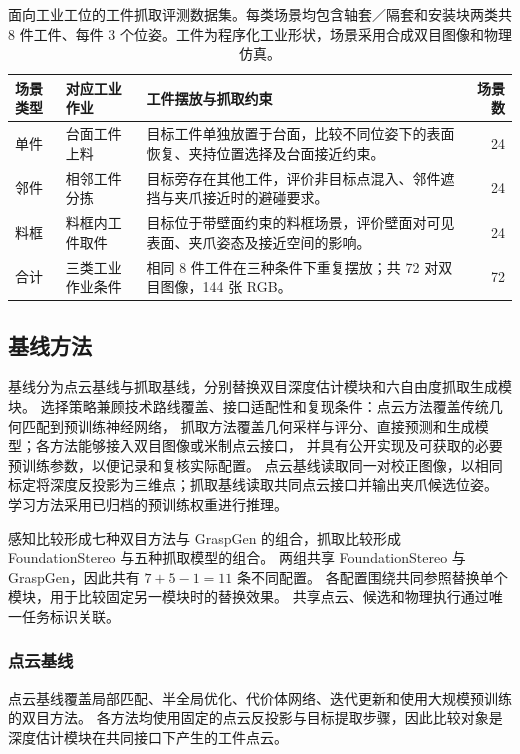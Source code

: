 \documentclass[UTF8,fontset=fandol,a4paper,11pt]{ctexart}
\newcommand{\qyb}[1]{\textcolor{red!75!black}{#1}}
\begin{document}
\begin{table}[H]
\centering\small
\caption{面向工业工位的工件抓取评测数据集。每类场景均包含轴套／隔套和安装块两类共 8 件工件、每件 3 个位姿。工件为程序化工业形状，场景采用合成双目图像和物理仿真。}
\label{tab:industrial-scenes}
\begin{tabularx}{\linewidth}{P{1.8cm}P{2.4cm}Y r}
\toprule
场景类型 & 对应工业作业 & 工件摆放与抓取约束 & 场景数 \\
\midrule
单件 & 台面工件上料 & 目标工件单独放置于台面，比较不同位姿下的表面恢复、夹持位置选择及台面接近约束。 & 24 \\
邻件 & 相邻工件分拣 & 目标旁存在其他工件，评价非目标点混入、邻件遮挡与夹爪接近时的避碰要求。 & 24 \\
料框 & 料框内工件取件 & 目标位于带壁面约束的料框场景，评价壁面对可见表面、夹爪姿态及接近空间的影响。 & 24 \\
\midrule
合计 & 三类工业作业条件 & 相同 8 件工件在三种条件下重复摆放；共 72 对双目图像，144 张 RGB。 & 72 \\
\bottomrule
\end{tabularx}
\end{table}

\subsection{\qyb{基线方法}}

基线分为点云基线与抓取基线，分别替换双目深度估计模块和六自由度抓取生成模块。
选择策略兼顾技术路线覆盖、接口适配性和复现条件：点云方法覆盖传统几何匹配到预训练神经网络，
抓取方法覆盖几何采样与评分、直接预测和生成模型；各方法能够接入双目图像或米制点云接口，
并具有公开实现及可获取的必要预训练参数，以便记录和复核实际配置。
点云基线读取同一对校正图像，以相同标定将深度反投影为三维点；抓取基线读取共同点云接口并输出夹爪候选位姿。
学习方法采用已归档的预训练权重进行推理。

感知比较形成七种双目方法与 GraspGen 的组合，抓取比较形成 FoundationStereo 与五种抓取模型的组合。
两组共享 FoundationStereo 与 GraspGen，因此共有 $7+5-1=11$ 条不同配置。
各配置围绕共同参照替换单个模块，用于比较固定另一模块时的替换效果。
共享点云、候选和物理执行通过唯一任务标识关联。

\subsubsection{点云基线}

点云基线覆盖局部匹配、半全局优化、代价体网络、迭代更新和使用大规模预训练的双目方法。
各方法均使用固定的点云反投影与目标提取步骤，因此比较对象是深度估计模块在共同接口下产生的工件点云。
\end{document}
